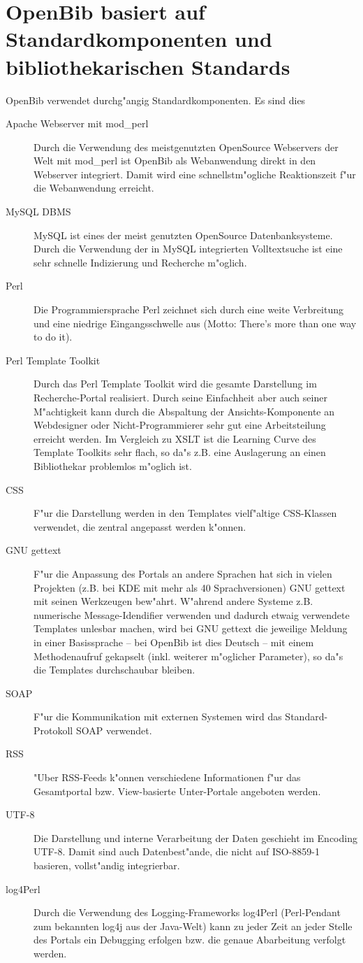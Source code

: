 \documentclass[11pt, twoside, a4paper, BCOR8mm, DIV12, bibtotoc,idxtotoc]{scrbook}
\begin{document}
\section{OpenBib basiert auf Standardkomponenten und bibliothekarischen Standards}
OpenBib verwendet durchg"angig Standardkomponenten. Es sind dies
\begin{description}
\item[Apache Webserver mit mod\_perl] Durch die Verwendung des
  meistgenutzten OpenSource Web\-servers der Welt mit mod\_perl ist OpenBib als
  Webanwendung direkt in den Web\-server integriert. Damit wird eine
  schnellstm"ogliche Reaktionszeit f"ur die Webanwendung erreicht.
\item[MySQL DBMS] MySQL ist eines der meist genutzten OpenSource
  Datenbanksysteme. Durch die Verwendung der in MySQL integrierten
  Volltextsuche ist eine sehr schnelle Indizierung und Recherche m"oglich.
\item[Perl] Die Programmiersprache Perl zeichnet sich durch eine weite
  Verbreitung und eine niedrige Eingangsschwelle aus (Motto: There's
  more than one way to do it).
\item[Perl Template Toolkit] Durch das Perl Template Toolkit wird die
  gesamte Darstellung im Re\-cher\-che-Portal realisiert. Durch seine
  Einfachheit aber auch seiner M"achtigkeit kann durch die Abspaltung
  der Ansichts-Komponente an Webdesigner oder Nicht-Programmierer sehr
  gut eine Arbeitsteilung erreicht werden. Im Vergleich zu XSLT ist
  die Learning Curve des Template Toolkits sehr flach, so da"s
  z.B. eine Auslagerung an einen Bibliothekar problemlos m"oglich ist.
\item[CSS] F"ur die Darstellung werden in den Templates vielf"altige
  CSS-Klassen verwendet, die zentral angepasst werden k"onnen.
\item[GNU gettext] F"ur die Anpassung des Portals an andere Sprachen
  hat sich in vielen Projekten (z.B. bei KDE mit mehr als 40
  Sprachversionen) GNU gettext mit seinen Werkzeugen
  bew"ahrt. W"ahrend andere Systeme z.B. numerische Message-Idendifier
  verwenden und dadurch etwaig verwendete Templates unlesbar machen,
  wird bei GNU gettext die jeweilige Meldung in einer Basissprache
  -- bei OpenBib ist dies Deutsch -- mit einem Methodenaufruf
  gekapselt (inkl. weiterer m"oglicher Parameter), so da"s die
  Templates durchschaubar bleiben.
\item[SOAP] F"ur die Kommunikation mit externen Systemen wird das
  Standard-Protokoll SOAP ver\-wen\-det.
\item[RSS] "Uber RSS-Feeds k"onnen verschiedene Informationen f"ur das
  Gesamtportal bzw. View-basierte Unter-Portale angeboten werden.
\item[UTF-8] Die Darstellung und interne Verarbeitung der Daten
  geschieht im Encoding UTF-8. Damit sind auch Datenbest"ande, die
  nicht auf ISO-8859-1 basieren, vollst"andig integrierbar.
\item[log4Perl] Durch die Verwendung des Logging-Frameworks log4Perl
  (Perl-Pendant zum bekannten log4j aus der Java-Welt) kann zu
  jeder Zeit an jeder Stelle des Portals ein Debugging erfolgen
  bzw. die genaue Abarbeitung verfolgt werden.
\end{description}
\end{document}
